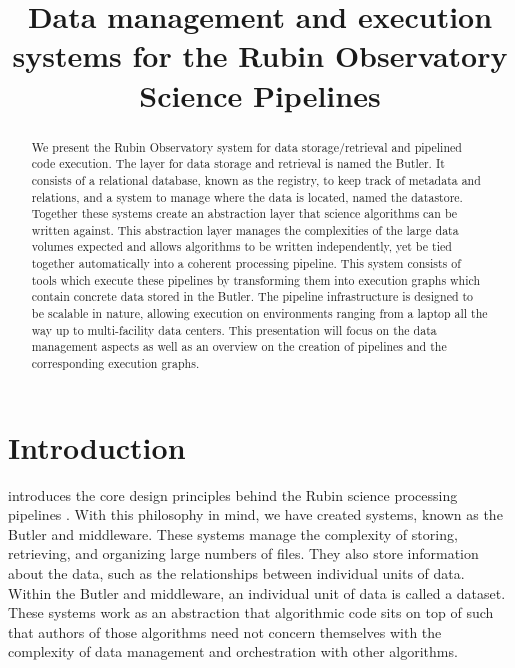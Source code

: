 \documentclass[11pt,twoside]{article}
\begin{document}




\title{Data management and execution systems for the Rubin Observatory Science Pipelines}


\begin{abstract}
    We present the Rubin Observatory system for data storage/retrieval and pipelined code execution. The layer for data storage and retrieval is named the Butler. It consists of a relational database, known as the registry, to keep track of metadata and relations, and a system to manage where the data is located, named the datastore. Together these systems create an abstraction layer that science algorithms can be written against. This abstraction layer manages the complexities of the large data volumes expected and allows algorithms to be written independently, yet be tied together automatically into a coherent processing pipeline. This system consists of tools which execute these pipelines by transforming them into execution graphs which contain concrete data stored in the Butler. The pipeline infrastructure is designed to be scalable in nature, allowing execution on environments ranging from a laptop all the way up to multi-facility data centers. This presentation will focus on the data management aspects as well as an overview on the creation of pipelines and the corresponding execution graphs.
\end{abstract}

\section{Introduction}

\citet{I08_adassxxxii} introduces the core design principles behind the Rubin science processing pipelines \citep{2019ApJ...873..111I}. With this philosophy in mind, we have created systems, known as the Butler and middleware. These systems manage the complexity of storing, retrieving, and organizing large numbers of files. They also store information about the data, such as the relationships between individual units of data. Within the Butler and middleware, an individual unit of data is called a dataset. These systems work as an abstraction that algorithmic code sits on top of such that authors of those algorithms need not concern themselves with the complexity of data management and orchestration with other algorithms.
\end{document}
